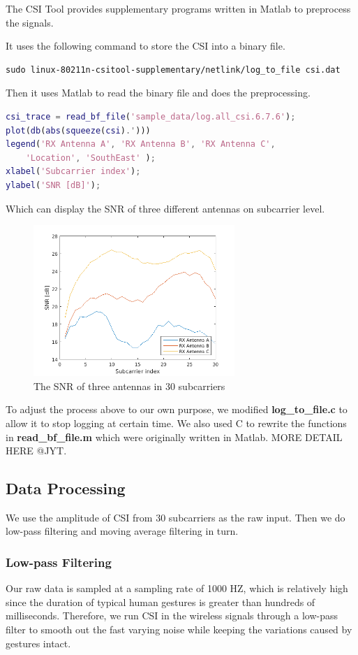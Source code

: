 \documentclass[conference]{IEEEtran}
\begin{document}
The CSI Tool provides supplementary programs written in Matlab to preprocess the signals.

It uses the following command to store the CSI into a binary file.
{ 
\scriptsize
\begin{lstlisting}[language=SH]
sudo linux-80211n-csitool-supplementary/netlink/log_to_file csi.dat
\end{lstlisting}
}

Then it uses Matlab to read the binary file and does the preprocessing.
{ 
\scriptsize
\begin{lstlisting}[language=MATLAB]
csi_trace = read_bf_file('sample_data/log.all_csi.6.7.6');
plot(db(abs(squeeze(csi).')))
legend('RX Antenna A', 'RX Antenna B', 'RX Antenna C', 
	'Location', 'SouthEast' );
xlabel('Subcarrier index');
ylabel('SNR [dB]');
\end{lstlisting}
}

Which can display the SNR of three different antennas on subcarrier level.
\begin{figure}[H]
\centering
\includegraphics[width=3in]{SNR.png}
\caption{The SNR of three antennas in 30 subcarriers}
\end{figure}

To adjust the process above to our own purpose, we modified \textbf{log\_to\_file.c} to allow it to stop logging at certain time. We also used C to rewrite the functions in \textbf{read\_bf\_file.m} which were originally written in Matlab. MORE DETAIL HERE @JYT.


\subsection{Data Processing}
We use the amplitude of CSI from 30 subcarriers as the raw input.
Then we do low-pass filtering and moving average filtering in turn.
\subsubsection{Low-pass Filtering}
Our raw data is sampled at a sampling rate of 1000 HZ, which is relatively high since the duration of typical human gestures is greater than hundreds of milliseconds. Therefore, we run CSI in the wireless signals through a low-pass filter to smooth out the fast varying noise while keeping the variations caused by gestures intact.
\end{document}

